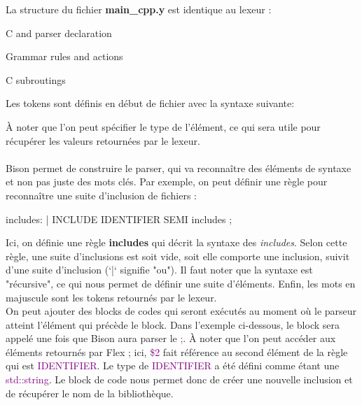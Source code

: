 \documentclass[a4paper]{article}%
\begin{document}
La structure du fichier \textbf{main\_cpp.y} est identique au lexeur :

\begin{code}
C and parser declaration

Grammar rules and actions

C subroutings
\end{code}\leavevmode\newline

Les tokens sont définis en début de fichier avec la syntaxe suivante:

\begin{code}
\end{code}\leavevmode\newline

À noter que l'on peut spécifier le type de l'élément, ce qui sera utile pour
récupérer les valeurs retournées par le lexeur.\\~\\


Bison permet de construire le parser, qui va reconnaître des éléments de syntaxe
et non pas juste des mots clés. Par exemple, on peut définir une règle pour
reconnaître une suite d'inclusion de fichiers :\\

\begin{code}[language=c++]
includes: %
       | INCLUDE IDENTIFIER SEMI includes
       ;
\end{code}\leavevmode\newline

Ici, on définie une règle \textbf{includes} qui décrit la syntaxe des \textit{includes}. Selon cette règle, une suite d'inclusions est soit vide, soit elle comporte une inclusion, suivit d'une suite d'inclusion (`|` signifie "ou"). Il faut noter que la syntaxe est "récursive", ce qui nous permet de définir une suite d'éléments.
Enfin, les mots en majuscule sont les tokens retournés par le lexeur.\\

On peut ajouter des blocks de codes qui seront exécutés au moment où le parseur
atteint l'élément qui précède le block. Dans l'exemple ci-dessous, le block sera appelé une fois que Bison aura parser le \textcolor{purple}{;}. À noter que l'on peut accéder aux éléments retournés par Flex ; ici, \textcolor{purple}{\$2} fait référence au second élément de la règle qui est \textcolor{purple}{IDENTIFIER}. Le type de \textcolor{purple}{IDENTIFIER} a été défini comme étant une \textcolor{purple}{std::string}. Le block de code nous permet donc de créer une nouvelle inclusion et de récupérer le nom de la bibliothèque.\\
\end{document}
